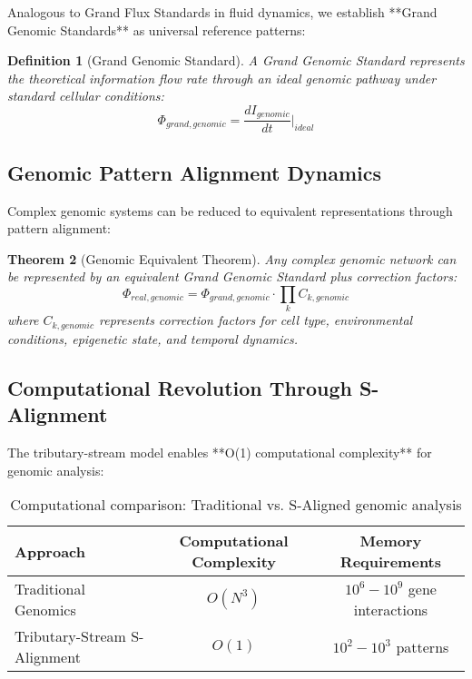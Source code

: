 \documentclass[12pt,a4paper]{article}
\newtheorem{theorem}{Theorem}[section]
\newtheorem{definition}[theorem]{Definition}
\begin{document}
Analogous to Grand Flux Standards in fluid dynamics, we establish **Grand Genomic Standards** as universal reference patterns:

\begin{definition}[Grand Genomic Standard]
A Grand Genomic Standard represents the theoretical information flow rate through an ideal genomic pathway under standard cellular conditions:
\begin{equation}
\Phi_{grand,genomic} = \frac{dI_{genomic}}{dt}\bigg|_{ideal}
\end{equation}
\end{definition}

\subsection{Genomic Pattern Alignment Dynamics}

Complex genomic systems can be reduced to equivalent representations through pattern alignment:

\begin{theorem}[Genomic Equivalent Theorem]
Any complex genomic network can be represented by an equivalent Grand Genomic Standard plus correction factors:
\begin{equation}
\Phi_{real,genomic} = \Phi_{grand,genomic} \cdot \prod_{k} C_{k,genomic}
\end{equation}
where $C_{k,genomic}$ represents correction factors for cell type, environmental conditions, epigenetic state, and temporal dynamics.
\end{theorem}

\subsection{Computational Revolution Through S-Alignment}

The tributary-stream model enables **O(1) computational complexity** for genomic analysis:

\begin{table}[H]
\centering
\begin{tabular}{lcc}
\toprule
Approach & Computational Complexity & Memory Requirements \\
\midrule
Traditional Genomics & $O(N^3)$ & $10^6 - 10^9$ gene interactions \\
Tributary-Stream S-Alignment & $O(1)$ & $10^2 - 10^3$ patterns \\
\bottomrule
\end{tabular}
\caption{Computational comparison: Traditional vs. S-Aligned genomic analysis}
\end{table}
\end{document}
